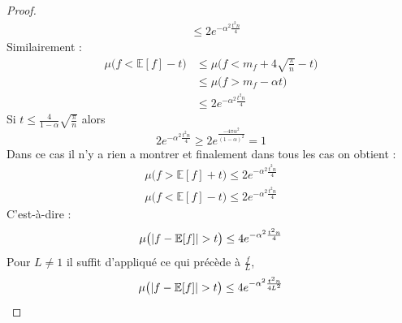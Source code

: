 \documentclass[12pt]{article}
\theoremstyle{definition}
\begin{document}
\begin{proof}
\begin{align*}
	&\leq 2 e^{-\alpha^2\frac{t^2n}{4}}
	\end{align*}
	Similairement :
	\begin{align*}
	\mu\big(f<\mathbb{E}[f]-t\big)&\leq \mu\big(f<m_f+4\sqrt{\frac{\pi}{n}}-t\big)\\
	&\leq \mu\big(f>m_f-\alpha t\big)\\
	&\leq 2 e^{-\alpha^2\frac{t^2n}{4}}
	\end{align*}
	Si $t\leq\frac{4}{1-\alpha}\sqrt{\frac{\pi}{n}}$ alors  
	\begin{equation*}
	2e^{-\alpha^2\frac{t^2n}{4}}\geq 2 e^{\frac{-4\pi\alpha^2}{(1-\alpha)^2}}=1
	\end{equation*}
	Dans ce cas il n'y a rien a montrer et finalement dans tous les cas on obtient :
	\begin{align*}
	\mu\big(f>\mathbb{E}[f]+t\big) \leq 2 e^{-\alpha^2\frac{t^2n}{4}}\\
	\mu\big(f<\mathbb{E}[f]-t\big)\leq 2 e^{-\alpha^2\frac{t^2n}{4}}
	\end{align*}
	C'est-à-dire : 
	\begin{equation*}
	\mu\big(|f-\mathbb{E}[f]|>t\big) \leq 4 e^{-\alpha^2\frac{t^2n}{4}}\\
	\end{equation*}
	Pour $L\neq 1$ il suffit d'appliqué ce qui précède à $\frac{f}{L}$,
	\begin{equation*}
	\mu\big(|f-\mathbb{E}[f]|>t\big) \leq 4 e^{-\alpha^2\frac{t^2n}{4L^2}}\\
	\end{equation*}
\end{proof}
\end{document}
